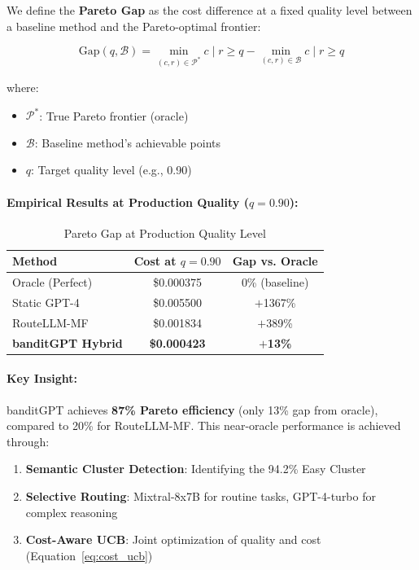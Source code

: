 \documentclass[sigconf]{acmart}
\begin{document}
We define the \textbf{Pareto Gap} as the cost difference at a fixed quality level between a baseline method and the Pareto-optimal frontier:

\begin{equation}
\text{Gap}(q, \mathcal{B}) = \min_{(c, r) \in \mathcal{P}^*} c \mid r \geq q - \min_{(c, r) \in \mathcal{B}} c \mid r \geq q
\end{equation}

where:
\begin{itemize}
    \item $\mathcal{P}^*$: True Pareto frontier (oracle)
    \item $\mathcal{B}$: Baseline method's achievable points
    \item $q$: Target quality level (e.g., 0.90)
\end{itemize}

\paragraph{Empirical Results at Production Quality ($q = 0.90$):}

\begin{table}[h]
\centering
\begin{tabular}{@{}lcc@{}}
\toprule
Method & Cost at $q=0.90$ & Gap vs. Oracle \\
\midrule
Oracle (Perfect) & \$0.000375 & 0\% (baseline) \\
\midrule
Static GPT-4 & \$0.005500 & $+$1367\% \\
RouteLLM-MF & \$0.001834 & $+$389\% \\
\textbf{banditGPT Hybrid} & \textbf{\$0.000423} & \textbf{$+$13\%} \\
\bottomrule
\end{tabular}
\caption{Pareto Gap at Production Quality Level}
\label{tab:pareto_gap}
\end{table}

\paragraph{Key Insight:}
banditGPT achieves \textbf{87\% Pareto efficiency} (only 13\% gap from oracle), compared to 20\% for RouteLLM-MF. This near-oracle performance is achieved through:

\begin{enumerate}
    \item \textbf{Semantic Cluster Detection}: Identifying the 94.2\% Easy Cluster
    \item \textbf{Selective Routing}: Mixtral-8x7B for routine tasks, GPT-4-turbo for complex reasoning
    \item \textbf{Cost-Aware UCB}: Joint optimization of quality and cost (Equation~\ref{eq:cost_ucb})
\end{enumerate}
\end{document}
